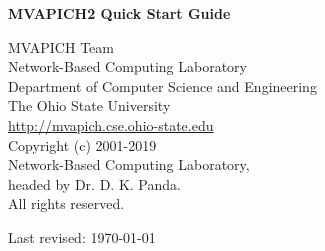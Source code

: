 \begin{minipage}[t]{\textwidth}
	\vspace*{1.0in}

	\begin{center}
	{\Large
		{\bf MVAPICH2 \mvapichversion  Quick Start Guide}\\
	}
	\end{center}
	\normalsize
	\begin{center}
		\vspace*{18.0ex}

		{\sc MVAPICH Team}\\
		\vspace*{5.0ex}
		{\sc Network-Based Computing Laboratory}\\
		{\sc Department of Computer Science and Engineering}\\
		{\sc The Ohio State University}\\
		\vspace*{5.0ex}
		{\href{http://mvapich.cse.ohio-state.edu}
		{http://mvapich.cse.ohio-state.edu}}\\

		\vspace*{2.0ex}
		Copyright (c) 2001-2019 \\
		Network-Based Computing Laboratory, \\
		headed by Dr. D. K. Panda.\\
		All rights reserved.

		\vspace*{4.0ex}
		Last revised: \today
		\vspace*{8.0ex}

	\end{center}
\end{minipage}
\setcounter{page}{0}
\thispagestyle{empty}

\newpage
